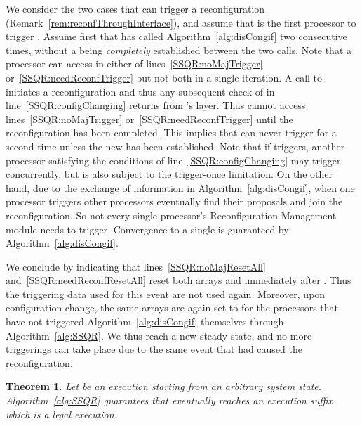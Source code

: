 \documentclass[11pt]{article}
\newtheorem{theorem}{Theorem}[section]
\newenvironment{proof}{\noindent{\bf Proof.}}{\hfill}
\begin{document}
\begin{proof}
We consider the two cases that can trigger a reconfiguration (Remark~\ref{rem:reconfThroughInterface}), and assume that  is the first processor to trigger .
Assume first that  has called Algorithm~\ref{alg:disCongif} two consecutive times, without a  being \emph{completely} established between the two calls. Note that a processor can access  in either of lines~\ref{SSQR:noMajTrigger} or~\ref{SSQR:needReconfTrigger} but not both in a single iteration.
A call to  initiates a reconfiguration and thus any subsequent check of  in line~\ref{SSQR:configChanging} returns  from 's  layer. 
Thus  cannot access lines~\ref{SSQR:noMajTrigger} or~\ref{SSQR:needReconfTrigger} until the reconfiguration has been completed. 
This implies that   can never trigger for a second time unless the new  has been established.
Note that if  triggers, another processor satisfying the conditions of line~\ref{SSQR:configChanging} may trigger concurrently, but is also subject to the trigger-once limitation.
On the other hand, due to the exchange of information in Algorithm~\ref{alg:disCongif}, when one processor triggers other processors eventually find their proposals and join the reconfiguration. 
So not every single processor's Reconfiguration Management module needs to trigger.
Convergence to a single  is guaranteed by Algorithm~\ref{alg:disCongif}.


We conclude by indicating that lines~\ref{SSQR:noMajResetAll} and~\ref{SSQR:needReconfResetAll} reset both arrays  and  immediately after .
Thus the triggering data used for this event are not used again.
Moreover, upon configuration change, the same arrays are again set to  for the processors that have not triggered Algorithm~\ref{alg:disCongif}  themselves through Algorithm~\ref{alg:SSQR}.
We thus reach a new steady  state, and no more triggerings can take place due to the same event that had caused the reconfiguration.
\end{proof}


\begin{theorem}
\label{thQ:corrUpperApp}
Let  be an execution starting from an arbitrary system state. Algorithm~\ref{alg:SSQR} guarantees that  eventually reaches an execution suffix which is a legal execution.
\end{theorem}
\end{document}
